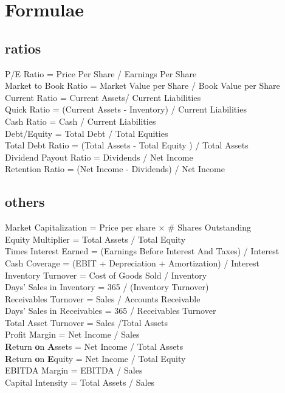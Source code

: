 \section{Formulae}
\subsection*{ratios}
\begin{scriptsize}
P/E Ratio = Price Per Share / Earnings Per Share \\
Market to Book Ratio = Market Value per Share / Book Value per Share \\
Current Ratio = Current Assets/ Current Liabilities \\
Quick Ratio = (Current Assets - Inventory) / Current Liabilities \\
Cash Ratio = Cash / Current Liabilities \\
Debt/Equity = Total Debt / Total Equities \\
Total Debt Ratio = (Total Assets - Total Equity ) / Total Assets \\
Dividend Payout Ratio = Dividends / Net Income \\
Retention Ratio = (Net Income - Dividends) / Net Income \\
\end{scriptsize}
\subsection*{others}
\begin{scriptsize}
Market Capitalization = Price per share $\times$ \# Shares Outstanding \\
Equity Multiplier = Total Assets / Total Equity \\
Times Interest Earned = (Earnings Before Interest And Taxes) / Interest \\
Cash Coverage = (EBIT + Depreciation + Amortization) / Interest \\
Inventory Turnover = Cost of Goods Sold / Inventory \\
Days' Sales in Inventory = 365 / (Inventory Turnover) \\
Receivables Turnover = Sales / Accounts Receivable \\
Days' Sales in Receivables = 365 / Receivables Turnover \\
Total Asset Turnover = Sales  /Total Assets  \\
Profit Margin = Net Income / Sales \\
\textbf{R}eturn \textbf{o}n \textbf{A}ssets = Net Income / Total Assets \\
\textbf{R}eturn \textbf{o}n \textbf{E}quity = Net Income / Total Equity \\
EBITDA Margin = EBITDA / Sales \\
Capital Intensity = Total Assets / Sales \\
\end{scriptsize}
